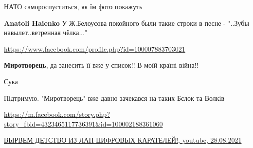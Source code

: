 \begin{itemize}
\begin{itemize}
 
НАТО самороспуститься, як їм фото покажуть

 
\textbf{Anatoli Haienko} У Ж.Белоусова покойного были такие строки в песне - "..Зубы навылет..ветренная чёлка..."\Laughey[1.0][white]
\end{itemize}

\url{https://www.facebook.com/profile.php?id=100007883703021}\par
 
\textbf{Миротворець}, да занесить її вже у список!! В моїй країні війна!!

\begin{itemize}
 
Сука

 
Підтримую.
"Миротворець" вже давно зачекався на таких Бєлок та Волків
\end{itemize}

 
\url{https://m.facebook.com/story.php?story_fbid=4323465117736391&id=100002188361060}

 
\href{https://youtu.be/f97yd0Fit8s}{%
ВЫРВЕМ ДЕТСТВО ИЗ ЛАП ЦИФРОВЫХ КАРАТЕЛЕЙ!, youtube, 28.08.2021%
}

\end{itemize}

